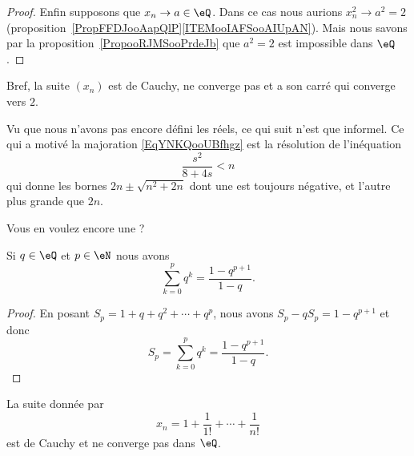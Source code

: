 \begin{proof}
    Enfin supposons que \( x_n\to a\in \eQ\). Dans ce cas nous aurions \( x_n^2\to a^2=2\) (proposition~\ref{PropFFDJooAapQlP}\ref{ITEMooIAFSooAIUpAN}). Mais nous savons par la proposition~\ref{PropooRJMSooPrdeJb} que \( a^2=2\) est impossible dans \( \eQ\).
\end{proof}

Bref, la suite \( (x_n)\) est de Cauchy, ne converge pas et a son carré qui converge vers \( 2\).

\begin{remark}\label{RemUZCAooWNogzI}
    Vu que nous n'avons pas encore défini les réels, ce qui suit n'est que informel. Ce qui a motivé la majoration \eqref{EqYNKQooUBfhgz} est la résolution de l'inéquation
    \begin{equation}
        \frac{ s^2 }{ 8+4s }<n
    \end{equation}
    qui donne les bornes \( 2n\pm\sqrt{n^2+2n}\) dont une est toujours négative, et l'autre plus grande que \( 2n\).
\end{remark}

Vous en voulez encore une ?

\begin{lemma}      \label{LEMooOTVUooImvusn}
    Si \( q\in \eQ\) et \( p\in \eN\) nous avons
    \begin{equation}
        \sum_{k=0}^pq^k=\frac{ 1-q^{p+1} }{ 1-q }.
    \end{equation}
\end{lemma}

\begin{proof}
    En posant \( S_p=1+q+q^2+\cdots +q^{p}\), nous avons $S_p-qS_p=1-q^{p+1}$ et donc
    \begin{equation}
        S_p=\sum_{k=0}^pq^k=\frac{ 1-q^{p+1} }{ 1-q }.
    \end{equation}
\end{proof}

\begin{proposition}
    La suite donnée par
    \begin{equation}
        x_n=1+\frac{ 1 }{ 1! }+\cdots +\frac{1}{ n! }
    \end{equation}
    est de Cauchy et ne converge pas dans \( \eQ\).
\end{proposition}

